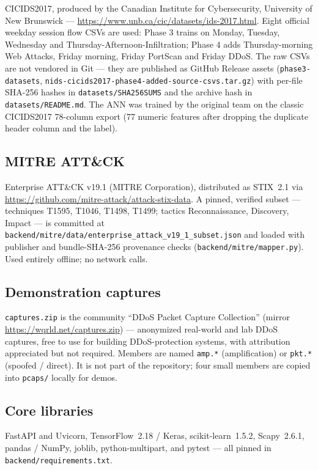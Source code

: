 \documentclass[11pt,a4paper]{article}
\begin{document}
CICIDS2017, produced by the Canadian Institute for Cybersecurity, University of
New Brunswick --- \url{https://www.unb.ca/cic/datasets/ids-2017.html}. Eight
official weekday session flow CSVs are used: Phase 3 trains on Monday, Tuesday,
Wednesday and Thursday-Afternoon-Infiltration; Phase 4 adds Thursday-morning Web
Attacks, Friday morning, Friday PortScan and Friday DDoS. The raw CSVs are not
vendored in Git --- they are published as GitHub Release assets
(\texttt{phase3-datasets},
\texttt{nids-cicids2017-phase4-added-source-csvs.tar.gz}) with per-file SHA-256
hashes in \texttt{datasets/SHA256SUMS} and the archive hash in
\texttt{datasets/README.md}. The ANN was trained by the original team on the
classic CICIDS2017 78-column export (77 numeric features after dropping the
duplicate header column and the label).

\subsection*{MITRE ATT\&CK}

Enterprise ATT\&CK v19.1 (MITRE Corporation), distributed as STIX~2.1 via
\url{https://github.com/mitre-attack/attack-stix-data}. A pinned, verified subset
--- techniques T1595, T1046, T1498, T1499; tactics Reconnaissance, Discovery,
Impact --- is committed at
\texttt{backend/mitre/data/enterprise\_attack\_v19\_1\_subset.json} and loaded
with publisher and bundle-SHA-256 provenance checks
(\texttt{backend/mitre/mapper.py}). Used entirely offline; no network calls.

\subsection*{Demonstration captures}

\texttt{captures.zip} is the community ``DDoS Packet Capture Collection'' (mirror
\url{https://wqrld.net/captures.zip}) --- anonymized real-world and lab DDoS
captures, free to use for building DDoS-protection systems, with attribution
appreciated but not required. Members are named \texttt{amp.*} (amplification) or
\texttt{pkt.*} (spoofed / direct). It is not part of the repository; four small
members are copied into \texttt{pcaps/} locally for demos.

\subsection*{Core libraries}

FastAPI and Uvicorn, TensorFlow~2.18 / Keras, scikit-learn~1.5.2, Scapy~2.6.1,
pandas / NumPy, joblib, python-multipart, and pytest --- all pinned in
\texttt{backend/requirements.txt}.
\end{document}
